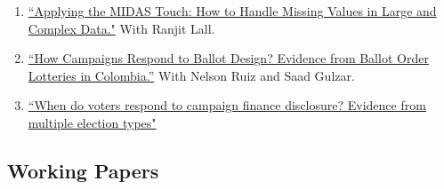 \documentclass[11pt, a4paper]{article}
\begin{document}
\begin{enumerate}

\item \href{https://doi.org/10.33774/apsa-2020-3tk40-v3}{``Applying the MIDAS Touch: How to Handle Missing Values in Large and Complex Data."} With Ranjit Lall.

\item \href{https://www.dropbox.com/s/4uybbp4h9shmzxt/ballots_colombia.pdf?raw=1}{``How Campaigns Respond to Ballot Design? Evidence from Ballot Order Lotteries in Colombia.''} With Nelson Ruiz and Saad Gulzar.

\item \href{https://ts-robinson.com/publication/robinson-voters-disclosure-2020/robinson-voters-disclosure-2020.pdf}{``When do voters respond to campaign finance disclosure? Evidence from multiple election types"}


\end{enumerate}

\subsection*{Working Papers}
\end{document}
